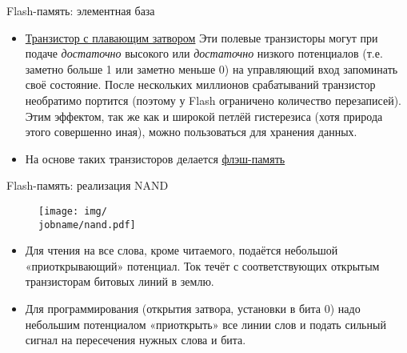 \documentclass[xetex,aspectratio=43]{beamer}
\begin{document}
\begin{frame}{Flash-память: элементная база}
    \begin{itemize}
        \item
        \href{http://en.wikipedia.org/wiki/Floating-gate_transistor}{Транзистор
            с плавающим затвором} Эти полевые транзисторы могут при подаче
        \emph{достаточно} высокого или \emph{достаточно} низкого потенциалов
        (т.е. заметно больше 1 или заметно меньше 0) на управляющий вход
        запоминать своё состояние. После нескольких миллионов срабатываний
        транзистор необратимо портится (поэтому у Flash ограничено количество
        перезаписей). Этим эффектом, так же как и широкой петлёй гистерезиса
        (хотя природа этого совершенно иная), можно пользоваться для хранения
        данных.
        \item
        На основе таких транзисторов делается
        \href{http://en.wikipedia.org/wiki/Flash_memory}{флэш-память}
    \end{itemize}
\end{frame}

\begin{frame}{Flash-память: реализация NAND}
    \begin{figure}
        \texttt{[image: img/\\jobname/nand.pdf]}
    \end{figure}

    \begin{itemize}
        \tightlist
        \item
        Для чтения на все слова, кроме читаемого, подаётся небольшой
        «приоткрывающий» потенциал. Ток течёт с соответствующих открытым
        транзисторам битовых линий в землю.
        \item
        Для программирования (открытия затвора, установки в бита 0) надо
        небольшим потенциалом «приоткрыть» все линии слов и подать сильный
        сигнал на пересечения нужных слова и бита.
    \end{itemize}
\end{frame}
\end{document}
